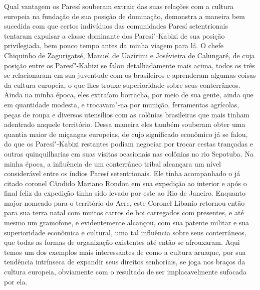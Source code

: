 Qual vantagem os Paresí souberam extrair das suas relações com a
cultura europeia na fundação de sua posição de dominação, demonstra a
maneira bem sucedida com que certos indivíduos das comunidades Paresí
setentrionais tentaram expulsar a classe dominante dos Paresí"-Kabizi de
sua posição privilegiada, bem pouco tempo antes da minha viagem para
lá. O chefe Chiquinho de Zagurigatsé, Manuel de Uazírimi e Josévieira
de Calungaré, de cuja posição entre os Paresí"-Kabizi se falou
detalhadamente mais acima, todos os três se relacionaram em sua
juventude com os brasileiros e aprenderam algumas coisas da cultura
europeia, o que lhes trouxe superioridade sobre seus conterrâneos. Ainda
na minha época, eles extraíam borracha, por meio de sua gente, ainda
que em quantidade modesta, e trocavam"-na por munição, ferramentas
agrícolas, peças de roupa e diversos utensílios com as colônias
brasileiras que mais tinham adentrado naquele território. Dessa
maneira eles também souberam obter uma quantia maior de miçangas
europeias, de cujo significado econômico já se falou, do que os
Paresí"-Kabizi restantes podiam negociar por trocar cestas trançadas e
outras quinquilharias em suas visitas ocasionais nas colônias no rio
Sepotuba. Na minha época, a influência de um conterrâneo tribal
alcançara um nível considerável entre os índios Paresí setentrionais.
Ele tinha acompanhado o já citado coronel Cândido Mariano Rondon em sua
expedição ao interior e após o final feliz da expedição tinha sido
levado por este ao Rio de Janeiro. Enquanto major nomeado para o
território do Acre, este Coronel Libanio retornou então para sua terra
natal com muitos carros de boi carregados com presentes, e até mesmo um
gramofone, e evidentemente alcançou, com sua patente militar e sua
superioridade econômica e cultural, uma tal influência sobre seus
conterrâneos, que todas as formas de organização existentes até então
se afrouxaram. Aqui temos um dos exemplos mais interessantes de como a
cultura aruaque, por sua tendência intrínseca de expandir seus direitos
senhoriais, se joga nos braços da cultura europeia, obviamente com o
resultado de ser implacavelmente sufocada por ela.


